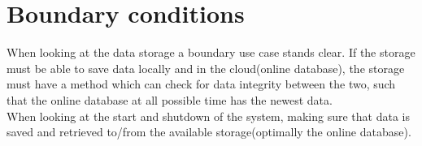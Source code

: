 \section{Boundary conditions}
When looking at the data storage a boundary use case stands clear. If the storage must be able to save data locally and in the cloud(online database), the storage must have a method which can check for data integrity between the two, such that the online database at all possible time has the newest data.\\

When looking at the start and shutdown of the system, making sure that data is saved and retrieved to/from the available storage(optimally the online database).